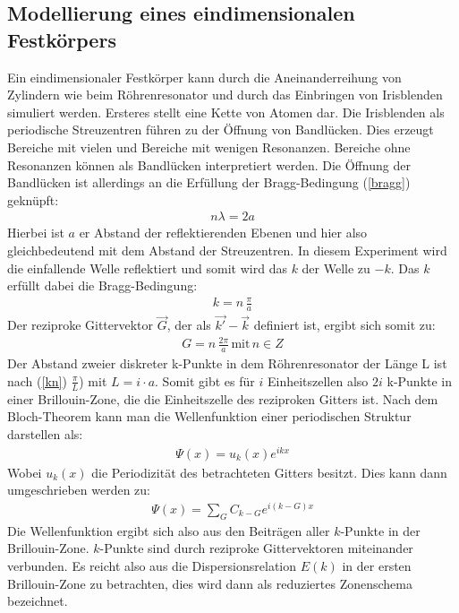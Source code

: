 \documentclass[german,  %
parskip=full,  %
]{scrartcl}
\begin{document}
\subsection{Modellierung eines eindimensionalen Festkörpers}
Ein eindimensionaler Festkörper kann durch die Aneinanderreihung von Zylindern wie beim Röhrenresonator und durch das Einbringen von Irisblenden simuliert werden. Ersteres stellt eine Kette von Atomen dar. Die Irisblenden als periodische Streuzentren führen zu der Öffnung von Bandlücken. Dies erzeugt Bereiche mit vielen und Bereiche mit wenigen Resonanzen. Bereiche ohne Resonanzen können als Bandlücken interpretiert werden. Die Öffnung der Bandlücken ist allerdings an die Erfüllung der Bragg-Bedingung (\ref{bragg}) geknüpft:
\begin{align}
\label{bragg} n\lambda=2a
\end{align}
Hierbei ist $a$ er Abstand der reflektierenden Ebenen und hier also gleichbedeutend mit dem Abstand der Streuzentren. In diesem Experiment wird die einfallende Welle reflektiert und somit wird das $k$ der Welle zu $-k$. Das $k$ erfüllt dabei die Bragg-Bedingung:
\begin{align}
\label{kn}k=n \, \frac{\pi}{a}
\end{align}
Der reziproke Gittervektor $\vec{G}$, der als $\vec{k'} - \vec{k}$ definiert ist, ergibt sich somit zu:
\begin{align}
G=n\,\frac{2\pi}{a} \, \text{mit} \, n \in Z
\end{align}
Der Abstand zweier diskreter k-Punkte in dem Röhrenresonator der Länge L ist nach (\ref{kn}) $\frac{\pi}{L}$) mit $L=i\cdot a$. Somit gibt es für $i$ Einheitszellen also $2i$ k-Punkte in einer Brillouin-Zone, die die Einheitszelle des reziproken Gitters ist. Nach dem Bloch-Theorem kann man die Wellenfunktion einer periodischen Struktur darstellen als: 
\begin{align}
\label{bloch} \Psi(x)=u_{k}(x)e^{ikx}
\end{align}
Wobei $u_k(x)$ die Periodizität des betrachteten Gitters besitzt. Dies kann dann umgeschrieben werden zu:
\begin{align}
\Psi(x)=\sum_{G} C_{k-G} e^{i(k-G)x}
\end{align}
Die Wellenfunktion ergibt sich also aus den Beiträgen aller $k$-Punkte in der Brillouin-Zone. $k$-Punkte sind durch reziproke Gittervektoren miteinander verbunden. Es reicht also aus die Dispersionsrelation $E(k)$ in der ersten Brillouin-Zone zu betrachten, dies wird dann als reduziertes Zonenschema bezeichnet.
\end{document}
